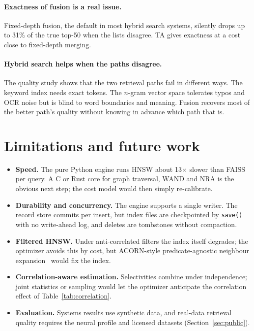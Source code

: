 \documentclass[11pt,a4paper]{article}
\newcommand{\code}[1]{\texttt{\small #1}}
\newcommand{\tab}[1]{Table~\ref{#1}}
\newcommand{\sect}[1]{Section~\ref{#1}}
\begin{document}
\paragraph{Exactness of fusion is a real issue.} Fixed-depth fusion, the default in most hybrid search
systems, silently drops up to 31\% of the true top-50 when the lists disagree. TA gives exactness at a
cost close to fixed-depth merging.

\paragraph{Hybrid search helps when the paths disagree.} The quality study shows that the two
retrieval paths fail in different ways. The keyword index needs exact tokens. The $n$-gram vector
space tolerates typos and OCR noise but is blind to word boundaries and meaning. Fusion recovers most
of the better path's quality without knowing in advance which path that is.

\section{Limitations and future work}
\label{sec:limits}

\begin{itemize}
  \item \textbf{Speed.} The pure Python engine runs HNSW about 13$\times$ slower than FAISS per query.
        A C or Rust core for graph traversal, WAND and NRA is the obvious next step; the cost model
        would then simply re-calibrate.
  \item \textbf{Durability and concurrency.} The engine supports a single writer. The record store
        commits per insert, but index files are checkpointed by \code{save()} with no write-ahead log,
        and deletes are tombstones without compaction.
  \item \textbf{Filtered HNSW.} Under anti-correlated filters the index itself degrades; the optimizer
        avoids this by cost, but ACORN-style predicate-agnostic neighbour expansion~\cite{acorn} would
        fix the index.
  \item \textbf{Correlation-aware estimation.} Selectivities combine under independence; joint
        statistics or sampling would let the optimizer anticipate the correlation effect of
        \tab{tab:correlation}.
  \item \textbf{Evaluation.} Systems results use synthetic data, and real-data retrieval quality
        requires the neural profile and licensed datasets (\sect{sec:public}).
\end{itemize}
\end{document}
